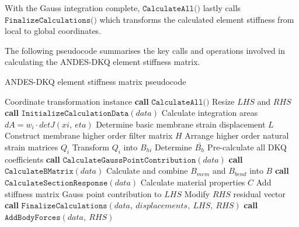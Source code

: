 With the Gauss integration complete, $\texttt{CalculateAll()}$ lastly calls $\texttt{FinalizeCalculations()}$ which transforms the calculated element stiffness from local to global coordinates.

The following pseudocode summarises the key calls and operations involved in calculating the ANDES-DKQ element stiffness matrix.

\begin{algorithm}
	\onehalfspacing
	\caption{ANDES-DKQ element stiffness matrix pseudocode}\label{ANDES-DKQ element stiffness matrix}
	\begin{algorithmic}[1]
		\Require Coordinate transformation instance
		\State \textbf{call} $\texttt{CalculateAll()}$
		\State Resize $LHS$ and $RHS$
		\State \textbf{call} $\texttt{InitializeCalculationData}(data)$
		\State \hspace{\algorithmicindent}Calculate integration areas $dA = w_i \cdot detJ(xi,\ eta)$
		\State \hspace{\algorithmicindent}Determine basic membrane strain displacement $L$
		\State \hspace{\algorithmicindent}Construct membrane higher order filter matrix $H$
		\State \hspace{\algorithmicindent}Arrange higher order natural strain matrices $Q_i$
		\State \hspace{\algorithmicindent}Transform $Q_i$ into $B_{hi}$
		\State \hspace{\algorithmicindent}Determine $\bar{B_h}$
		\State \hspace{\algorithmicindent}Pre-calculate all DKQ coefficients
		\State \textbf{call} $\texttt{CalculateGaussPointContribution}(data)$
		\State \hspace{\algorithmicindent}\textbf{call} $\texttt{CalculateBMatrix}(data)$
		\State \hspace{\algorithmicindent}\hspace{\algorithmicindent} Calculate and combine $B_{mem}$ and $B_{bend}$ into $B$
		\State \hspace{\algorithmicindent}\textbf{call} $\texttt{CalculateSectionResponse}(data)$
		\State \hspace{\algorithmicindent}\hspace{\algorithmicindent} Calculate material properties $C$
		\State \hspace{\algorithmicindent}Add stiffness matrix Gauss point contribution to $LHS$
		\EndWhile
		\State Modify $RHS$ residual vector
		\State \textbf{call} $\texttt{FinalizeCalculations}(data,\ displacements,\ LHS,\ RHS)$
		\State \textbf{call} $\texttt{AddBodyForces}(data,\ RHS)$
	\end{algorithmic}
\end{algorithm}

